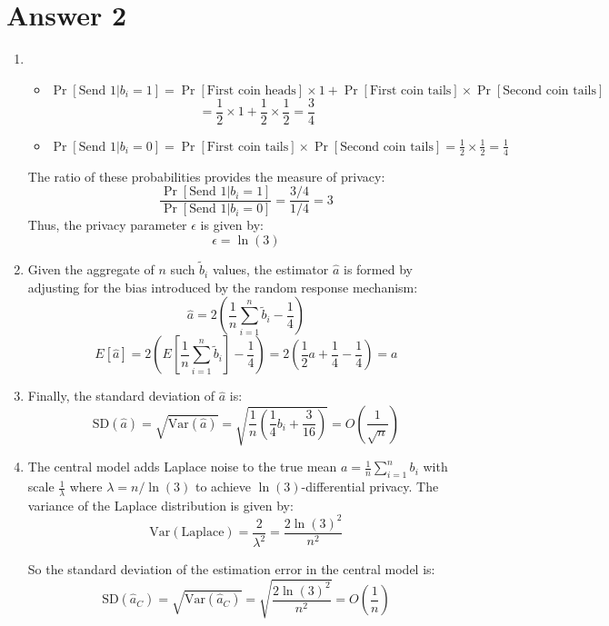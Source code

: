 \documentclass[
	12pt, %
]{fphw}
\begin{document}
\section*{Answer 2}
\begin{enumerate}

\item\begin{itemize}
	\item \( \Pr[\text{Send } 1 | b_i = 1] = \Pr[\text{First coin heads}] \times 1 + \Pr[\text{First coin tails}] \times \Pr[\text{Second coin tails}] \)
	\[
	= \frac{1}{2} \times 1 + \frac{1}{2} \times \frac{1}{2} = \frac{3}{4}
	\]
	
\item \( \Pr[\text{Send } 1 | b_i = 0] = \Pr[\text{First coin tails}] \times \Pr[\text{Second coin tails}] = \frac{1}{2} \times \frac{1}{2} = \frac{1}{4} \)
\end{itemize}


The ratio of these probabilities provides the measure of privacy:
\[ \frac{\Pr[\text{Send } 1 | b_i = 1]}{\Pr[\text{Send } 1 | b_i = 0]} = \frac{3/4}{1/4} = 3 \]
Thus, the privacy parameter \( \epsilon \) is given by:
\[ \epsilon = \ln(3) \]

\item Given the aggregate of \( n \) such \( \tilde{b}_i \) values, the estimator \( \hat{a} \) is formed by adjusting for the bias introduced by the random response mechanism:
\[
\hat{a} = 2 \left( \frac{1}{n} \sum_{i=1}^n \tilde{b}_i - \frac{1}{4} \right)
\]
\[
E[\hat{a}] = 2 \left( E\left[ \frac{1}{n} \sum_{i=1}^n \tilde{b}_i \right] - \frac{1}{4} \right) = 2 \left( \frac{1}{2}a + \frac{1}{4} - \frac{1}{4} \right) = a
\]

\item Finally, the standard deviation of \(\hat{a}\) is:
\[
\text{SD}(\hat{a}) = \sqrt{\text{Var}(\hat{a})} = \sqrt{\frac{1}{n} \left(\frac{1}{4}b_i + \frac{3}{16}\right)} = O\left(\frac{1}{\sqrt{n}}\right)
\]


\item The central model adds Laplace noise to the true mean \(a = \frac{1}{n} \sum_{i=1}^n b_i\) with scale \(\frac{1}{\lambda}\) where \(\lambda = n/\ln(3)\) to achieve \(\ln(3)\)-differential privacy. The variance of the Laplace distribution is given by:
\[
\text{Var}(\text{Laplace}) = \frac{2}{\lambda^2} = \frac{2 \ln(3)^2}{n^2}
\]


So the standard deviation of the estimation error in the central model is:
\[
\text{SD}(\hat{a}_C) = \sqrt{\text{Var}(\hat{a}_C)} = \sqrt{\frac{2 \ln(3)^2}{n^2}} = O\left(\frac{1}{n}\right)
\]


\end{enumerate}
\end{document}
